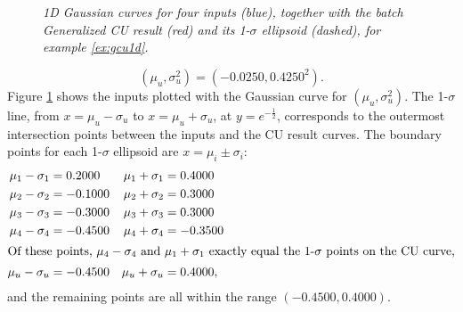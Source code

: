 \begin{example}
\begin{figure}[tbp]
    \caption{\it 1D Gaussian curves for four inputs (blue), together with the batch Generalized CU result (red) and
            its 1-$\sigma$ ellipsoid (dashed), for example \ref{ex:gcu1d}.}
    \label{fig:cu1d}
\end{figure}
\begin{equation}
    (\mu_u,\sigma_u^2) = (-0.0250,0.4250^2).
\end{equation}
Figure \ref{fig:cu1d} shows the inputs plotted with the Gaussian curve for $(\mu_u,\sigma_u^2)$. The 1-$\sigma$ line,
from $x=\mu_u-\sigma_u$ to $x=\mu_u+\sigma_u$, at $y=e^{-\frac{1}{2}}$, corresponds to the outermost intersection points
between the inputs and the CU result curves. The boundary points for each 1-$\sigma$ ellipsoid are $x=\mu_i\pm\sigma_i$:
\begin{align}
    \mu_1-\sigma_1 &= 0.2000 & \mu_1+\sigma_1 &= 0.4000\nonumber\\
    \mu_2-\sigma_2 &= -0.1000 & \mu_2+\sigma_2 &= 0.3000\nonumber\\
    \mu_3-\sigma_3 &= -0.3000 & \mu_3+\sigma_3 &= 0.3000\nonumber\\
    \mu_4-\sigma_4 &= -0.4500 & \mu_4+\sigma_4 &= -0.3500\\
\intertext{Of these points, $\mu_4-\sigma_4$ and $\mu_1+\sigma_1$ exactly equal the 1-$\sigma$ points on the CU curve,}
    \mu_u-\sigma_u &= -0.4500 & \mu_u+\sigma_u &= 0.4000,
\end{align}
and the remaining points are all within the range $(-0.4500,0.4000)$.


\end{example}
